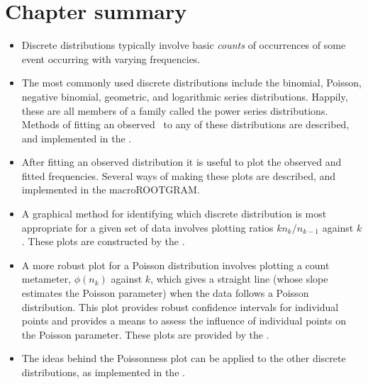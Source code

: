 \section{Chapter summary}
\begin{itemize}
\item Discrete distributions typically involve basic \emph{counts} of occurrences
of some event occurring with varying frequencies.
\item The most commonly used discrete distributions include the binomial,
Poisson, negative binomial, geometric, and logarithmic series distributions.
Happily, these are all members of a family called the
power series distributions.
Methods of fitting an observed \Dset\ to any of these distributions are
described, and implemented in the .
\item After fitting an observed distribution it is useful to plot the observed
and fitted frequencies.
Several ways of making these plots are described, and implemented in the
macro{ROOTGRAM}.
\item A graphical method for identifying which discrete distribution is most
appropriate for a given set of data involves plotting ratios
$k n_k / n_{k-1}$ against $k$.
These plots are constructed by the .
\item A more robust plot for a Poisson distribution involves plotting
a count metameter, $\phi ( n_k ) $ against $k$, which
gives a straight line (whose slope estimates the Poisson parameter)
when the data follows a Poisson distribution.
This plot provides robust confidence intervals for individual points
and provides a means to assess the influence of individual points
on the Poisson parameter.
These plots are provided by the .
\item The ideas behind the Poissonness plot can be applied to the other
discrete distributions, as implemented in the .
\end{itemize}

